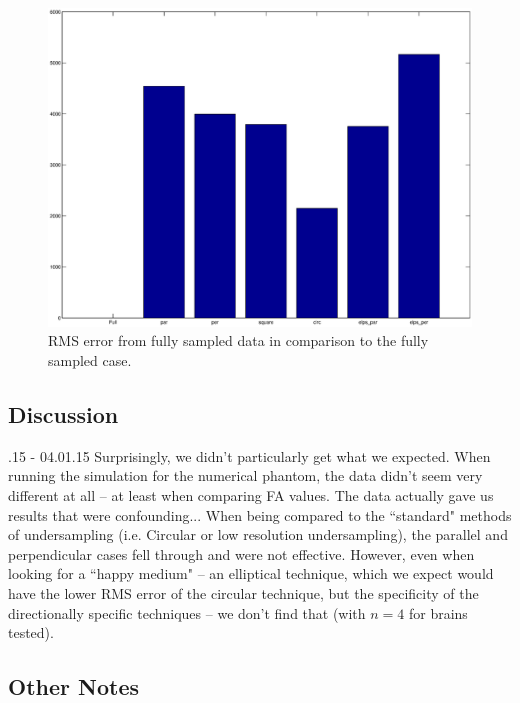 \documentclass[11 pt]{article}
\begin{document}
    \begin{figure}[h]
      \centering
      \vspace{0pt}
      \setlength\fboxsep{0pt}
      \setlength\fboxrule{0.5pt}
      \includegraphics[trim = {10mm 0mm 10mm 0mm},clip,scale = 0.4] {Figs/numericalSims/brainRMS.eps}
      \caption{RMS error from fully sampled data in comparison to the fully sampled case.}
      \label{fig:RMSBrain}

    \end{figure}
    
  
  \subsection{Discussion}
  
  .15 - 04.01.15
  Surprisingly, we didn't particularly get what we expected. When running the simulation for the numerical phantom, the data didn't seem very different at all -- at least when comparing FA values. The data actually gave us results that were confounding... When being compared to the ``standard" methods of undersampling (i.e. Circular or low resolution undersampling), the parallel and perpendicular cases fell through and were not effective. However, even when looking for a ``happy medium" -- an elliptical technique, which we expect would have the lower RMS error of the circular technique, but the specificity of the directionally specific techniques -- we don't find that (with $n = 4$ for brains tested).
  
  
  \subsection{Other Notes}
  
\end{document}
